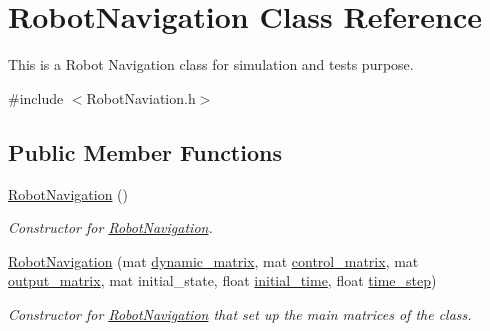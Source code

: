 \hypertarget{class_robot_navigation}{}\section{Robot\+Navigation Class Reference}
\label{class_robot_navigation}


This is a Robot Navigation class for simulation and tests purpose.  




{\ttfamily \#include $<$Robot\+Naviation.\+h$>$}

\subsection*{Public Member Functions}
\begin{DoxyCompactItemize}
\item 
\mbox{\label{class_robot_navigation_a949517ad58b54558b5e97fb7154f185b}} 
\hyperlink{class_robot_navigation_a949517ad58b54558b5e97fb7154f185b}{Robot\+Navigation} ()
\begin{DoxyCompactList}\small\item\em Constructor for \hyperlink{class_robot_navigation}{Robot\+Navigation}. \end{DoxyCompactList}\item 
\mbox{\label{class_robot_navigation_a2c88a38c320bfb414db056f117062043}} 
\hyperlink{class_robot_navigation_a2c88a38c320bfb414db056f117062043}{Robot\+Navigation} (mat \hyperlink{class_robot_navigation_a1aad778b34e54f7fc85ec3ed744a444c}{dynamic\+\_\+matrix}, mat \hyperlink{class_robot_navigation_a3cd228690cd188060ee65ca92c273be5}{control\+\_\+matrix}, mat \hyperlink{class_robot_navigation_a30f84b9b191d662b8d6c5ba9ab4e665b}{output\+\_\+matrix}, mat initial\+\_\+state, float \hyperlink{class_robot_navigation_a0aefa2162f9e8911625c977b134cd333}{initial\+\_\+time}, float \hyperlink{class_robot_navigation_a1f1de08123eaff99571bb21fa411d4dd}{time\+\_\+step})
\begin{DoxyCompactList}\small\item\em Constructor for \hyperlink{class_robot_navigation}{Robot\+Navigation} that set up the main matrices of the class. \end{DoxyCompactList}\item 
\mbox{\label{class_robot_navigation_af29a5bb696c20ee7c8ced94f2c33b893}} 

\end{DoxyCompactItemize}
